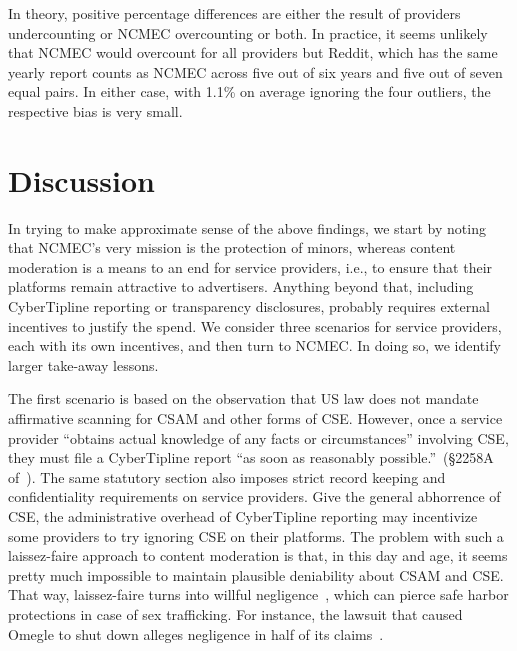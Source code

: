\documentclass[anonymous,nonacm,screen,12pt]{acmart}
\newcommand\V[1]{{#1}}
\newcommand\V[1]{\textsc{\MakeLowercase{#1}}}
\theoremstyle{definition}
\begin{document}
In theory, positive percentage differences are either the result of providers
undercounting or \V{NCMEC} overcounting or both. In practice, it seems unlikely
that \V{NCMEC} would overcount for all providers but Reddit, which has the same
yearly report counts as \V{NCMEC} across five out of six years and five out of
seven equal pairs. In either case, with 1.1\% on average ignoring the four
outliers, the respective bias is very small.


\section{Discussion}
\label{sec:discussion}

In trying to make approximate sense of the above findings, we start by noting
that \V{NCMEC}'s very mission is the protection of minors, whereas content
moderation is a means to an end for service providers, i.e., to ensure that
their platforms remain attractive to advertisers. Anything beyond that,
including CyberTipline reporting or transparency disclosures, probably requires
external incentives to justify the spend. We consider three scenarios for
service providers, each with its own incentives, and then turn to \V{NCMEC}. In
doing so, we identify larger take-away lessons.

The first scenario is based on the observation that \V{US} law does not mandate
affirmative scanning for \V{CSAM} and other forms of \V{CSE}. However, once a
service provider ``obtains actual knowledge of any facts or circumstances''
involving \V{CSE}, they must file a CyberTipline report ``as soon as reasonably
possible.''~(\S\V{2258A} of~\citet{USCode18Chapter110}). The same statutory
section also imposes strict record keeping and confidentiality requirements on
service providers. Give the general abhorrence of \V{CSE}, the administrative
overhead of CyberTipline reporting may incentivize some providers to try
ignoring \V{CSE} on their platforms. The problem with such a laissez-faire
approach to content moderation is that, in this day and age, it seems pretty
much impossible to maintain plausible deniability about \V{CSAM} and \V{CSE}.
That way, laissez-faire turns into willful negligence~\cite{SalterSokolov2024},
which can pierce safe harbor protections in case of sex trafficking. For
instance, the lawsuit that caused Omegle to shut down alleges negligence in half
of its claims~\cite{LongGoldbergea2022}.
\end{document}
